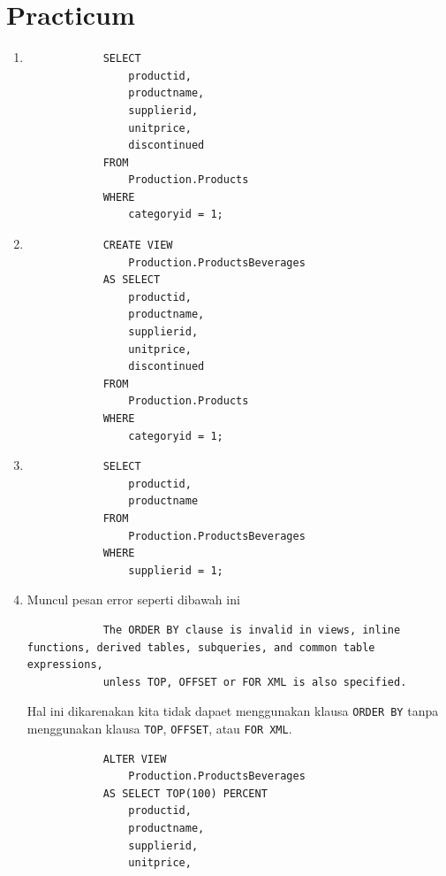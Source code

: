 \documentclass[12pt,titlepage]{article}
\begin{document}
\section{Practicum}
\begin{enumerate}
    \item {
        \begin{verbatim}
            SELECT
                productid,
                productname,
                supplierid,
                unitprice,
                discontinued
            FROM
                Production.Products
            WHERE
                categoryid = 1;
        \end{verbatim}
    }
    \item {
        \begin{verbatim}
            CREATE VIEW
                Production.ProductsBeverages
            AS SELECT
                productid,
                productname,
                supplierid,
                unitprice,
                discontinued
            FROM
                Production.Products
            WHERE
                categoryid = 1;
        \end{verbatim}
    }
    \item {
        \begin{verbatim}
            SELECT
                productid,
                productname
            FROM
                Production.ProductsBeverages
            WHERE
                supplierid = 1;
        \end{verbatim}
    }
    \pagebreak
    \item {
        Muncul pesan error seperti dibawah ini
        \begin{verbatim}
            The ORDER BY clause is invalid in views, inline functions, derived tables, subqueries, and common table expressions, 
            unless TOP, OFFSET or FOR XML is also specified.
        \end{verbatim}
        Hal ini dikarenakan kita tidak dapaet menggunakan klausa \texttt{ORDER BY} tanpa
        menggunakan klausa \texttt{TOP}, \texttt{OFFSET}, atau \texttt{FOR XML}.
        \begin{verbatim}
            ALTER VIEW
                Production.ProductsBeverages
            AS SELECT TOP(100) PERCENT
                productid,
                productname,
                supplierid,
                unitprice,

\end{verbatim}}
\end{enumerate}
\end{document}
